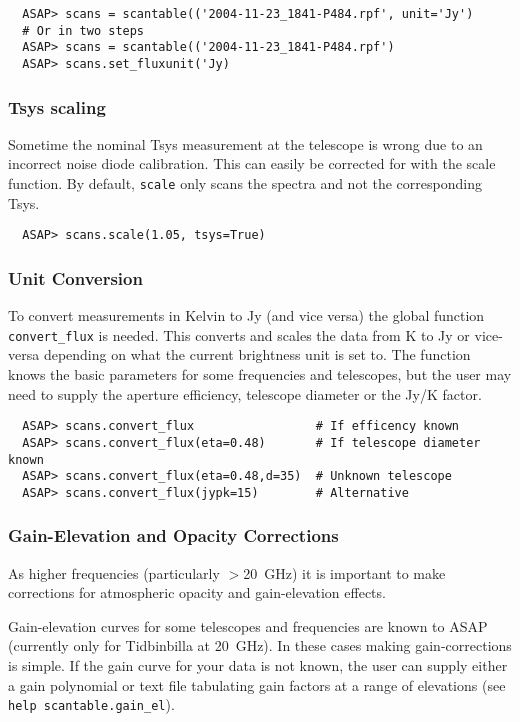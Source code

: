 \documentclass[11pt]{article}
\newcommand{\cmd}[1]{{\tt #1}}
\begin{document}
\begin{verbatim}
  ASAP> scans = scantable(('2004-11-23_1841-P484.rpf', unit='Jy')
  # Or in two steps
  ASAP> scans = scantable(('2004-11-23_1841-P484.rpf')
  ASAP> scans.set_fluxunit('Jy)
\end{verbatim}

\subsubsection{Tsys scaling}

Sometime the nominal Tsys measurement at the telescope is wrong due to
an incorrect noise diode calibration. This can easily be corrected for
with the scale function. By default, \cmd{scale} only scans the
spectra and not the corresponding Tsys.

\begin{verbatim}
  ASAP> scans.scale(1.05, tsys=True) 
\end{verbatim}

\subsubsection{Unit Conversion}

To convert measurements in Kelvin to Jy (and vice versa) the global
function \cmd{convert\_flux} is needed. This converts and scales the data
from K to Jy or vice-versa depending on what the current brightness unit is
set to. The function knows the basic parameters for some frequencies
and telescopes, but the user may need to supply the aperture
efficiency, telescope diameter or the Jy/K factor.

\begin{verbatim}
  ASAP> scans.convert_flux                 # If efficency known
  ASAP> scans.convert_flux(eta=0.48)       # If telescope diameter known
  ASAP> scans.convert_flux(eta=0.48,d=35)  # Unknown telescope
  ASAP> scans.convert_flux(jypk=15)        # Alternative
\end{verbatim}

\subsubsection{Gain-Elevation and Opacity Corrections}

As higher frequencies (particularly $>$20~GHz) it is important to make
corrections for atmospheric opacity and gain-elevation effects. 

Gain-elevation curves for some telescopes and frequencies are known to
ASAP (currently only for Tidbinbilla at 20~GHz).  In these cases making
gain-corrections is simple.  If the gain curve for your data is not
known, the user can supply either a gain polynomial or text file
tabulating gain factors at a range of elevations (see \cmd{help
scantable.gain\_el}).
\end{document}
